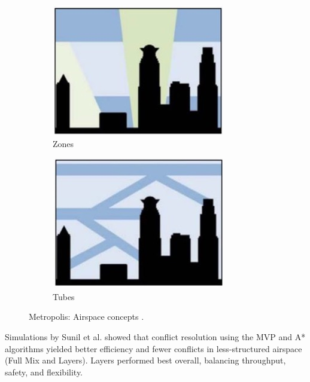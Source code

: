 \begin{figure}[!ht]
\begin{subfigure}{.23\textwidth}
        \includegraphics[width=\textwidth]{img/zones.jpg}
        \caption{Zones}
        \label{Zones}
    \end{subfigure}
    \begin{subfigure}{.23\textwidth}
        \includegraphics[width=\textwidth]{img/tubes.jpg}
        \caption{Tubes}
        \label{tubes}
    \end{subfigure}
    \caption{Metropolis: Airspace concepts \cite{Schuchardt_2023}.}
    \label{airspace-concepts}
\end{figure}

Simulations by Sunil et al. \cite{Sunil_2015} showed that conflict resolution using the \gls{MVP} and A* algorithms yielded better efficiency and fewer conflicts in less-structured airspace (Full Mix and Layers). 
Layers performed best overall, balancing throughput, safety, and flexibility.


